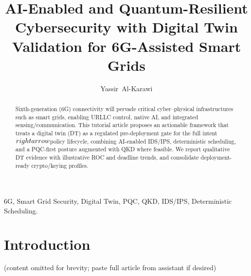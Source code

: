 \documentclass[journal]{IEEEtran}
\title{AI-Enabled and Quantum-Resilient Cybersecurity with Digital Twin Validation for 6G-Assisted Smart Grids}
\author{Yassir~Al-Karawi}
\begin{document}
\maketitle
\begin{abstract}
Sixth-generation (6G) connectivity will pervade critical cyber--physical infrastructures such as smart grids, enabling URLLC control, native AI, and integrated sensing/communication. This tutorial article proposes an actionable framework that treats a digital twin (DT) as a regulated pre-deployment gate for the full intent$\\rightarrow$policy lifecycle, combining AI-enabled IDS/IPS, deterministic scheduling, and a PQC-first posture augmented with QKD where feasible. We report qualitative DT evidence with illustrative ROC and deadline trends, and consolidate deployment-ready crypto/keying profiles.
\end{abstract}
\begin{IEEEkeywords}6G, Smart Grid Security, Digital Twin, PQC, QKD, IDS/IPS, Deterministic Scheduling.\end{IEEEkeywords}
\section{Introduction} (content omitted for brevity; paste full article from assistant if desired)
\end{document}
